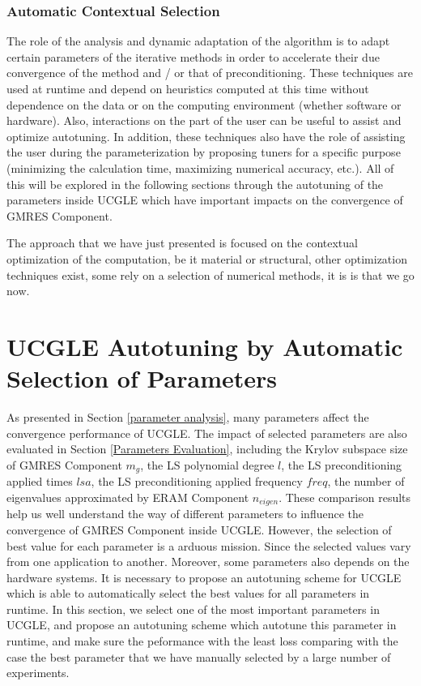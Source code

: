\subsubsection{Automatic Contextual Selection}

The role of the analysis and dynamic adaptation of the algorithm is to adapt certain parameters of the iterative methods in order to accelerate their due convergence of the method and / or that of preconditioning. These techniques are used at runtime and depend on heuristics computed at this time without dependence on the data or on the computing environment (whether software or hardware). Also, interactions on the part of the user can be useful to assist and optimize autotuning. In addition, these techniques also have the role of assisting the user during the parameterization by proposing tuners for a specific purpose (minimizing the calculation time, maximizing numerical accuracy, etc.). All of this will be explored in the following sections through the autotuning of the parameters inside UCGLE which have important impacts on the convergence of GMRES Component.

The approach that we have just presented is focused on the contextual optimization of the computation, be it material or structural, other optimization techniques exist, some rely on a selection of numerical methods, it is is that we go now.


\section{UCGLE Autotuning by Automatic Selection of Parameters}

As presented in Section \ref{parameter analysis}, many parameters affect the convergence performance of UCGLE. The impact of selected parameters are also evaluated in Section \ref{Parameters Evaluation}, including the Krylov subspace size of GMRES Component $m_g$, the LS polynomial degree $l$, the LS preconditioning applied times $lsa$, the LS preconditioning applied frequency $freq$, the number of eigenvalues approximated by ERAM Component $n_{eigen}$. These comparison results help us well understand the way of different parameters to influence the convergence of GMRES Component inside UCGLE. However, the selection of best value for each parameter is a arduous mission. Since the selected values vary from one application to another. Moreover, some parameters also depends on the hardware systems. It is necessary to propose an autotuning scheme for UCGLE which is able to automatically select the best values for all parameters in runtime. In this section, we select one of the most important parameters in UCGLE, and propose an autotuning scheme which autotune this parameter in runtime, and make sure the peformance with the least loss comparing with the case the best parameter that we have manually selected by a large number of experiments.

